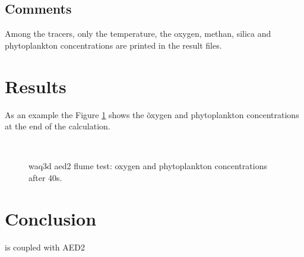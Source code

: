 %
\subsection{Comments}
Among the tracers, only the temperature, the oxygen, methan, silica and phytoplankton concentrations are printed in the result files.

%
%
\section{Results}

As an example the Figure \ref{fig:res} shows the õxygen and phytoplankton concentrations at the end of the calculation.
%

\begin{figure} [H]
\centering
{}~~
 \caption{waq3d aed2 flume test: oxygen and phytoplankton concentrations after 40s.}
 \label{fig:res}
\end{figure}


%
\section{Conclusion}
%
 is coupled with AED2
%
%


